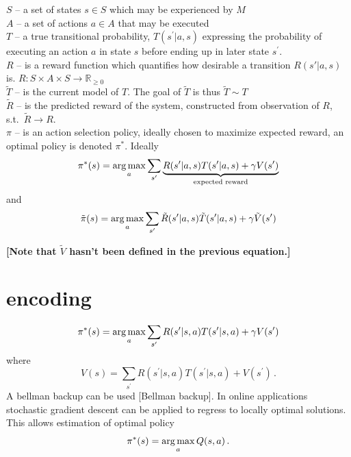 $S$ -- a set of states $s\in S$ which may be experienced by $M$\\
$A$ -- a set of actions $a\in A$ that may be executed\\
$T$ -- a true transitional probability, $T(s^{\prime}|a,s)$ expressing the probability of executing an action $a$ in state $s$ before ending up in later state $s^{\prime}$.\\
$R$ -- is a reward function which quantifies how desirable a transition $R(s'|a,s)$ is. $R: S\times A \times S\rightarrow \mathbb{R}_{\geq 0}$\\
$\tilde{T}$ -- is the current model of $T$. The goal of $\tilde{T}$ is thus $\tilde{T}\sim T$\\
$\tilde{R}$ -- is the predicted reward of the system, constructed from observation of $R$, s.t.\ $\tilde{R}\rightarrow R$. \\
$\pi$ -- is an action selection policy, ideally chosen to maximize expected reward, an optimal policy is denoted $\pi^*$. Ideally
\begin{equation*}
\pi^*(s) = \operatorname*{arg\,max}_{a}\sum_{s^\prime}\underbrace{R(s^\prime|a,s) T(s'|a,s)+\gamma V(s^\prime)}_{\text{expected reward}}
\end{equation*}
and
\begin{equation*}
\tilde{\pi}(s)  = \operatorname*{arg\,max}_{a}\sum_{s^\prime}\tilde{R}(s^\prime|a,s) \tilde{T}(s'|a,s)+\gamma \tilde{V}(s^\prime)
\end{equation*}

\textbf{[Note that $\tilde{V}$ hasn't been defined in the previous equation.]}

\section*{encoding}

\begin{equation*}
\pi^*(s) = \operatorname*{arg\,max}_{a}\sum_{s^\prime} R(s^\prime|s,a) T(s'|s,a)+\gamma V(s^\prime)
\end{equation*}
where
\begin{equation*}
V(s) = \sum_{s^\prime} R(s^\prime|s,a) T(s^\prime|s,a) +V(s^\prime)\,.
\end{equation*}
A bellman backup can be used [Bellman backup]. In online applications stochastic gradient descent can be applied to regress to locally optimal solutions. This allows estimation of optimal policy
\begin{equation*}
\pi^*(s) = \operatorname*{arg\,max}_{a} Q(s,a)\,.
\end{equation*}

